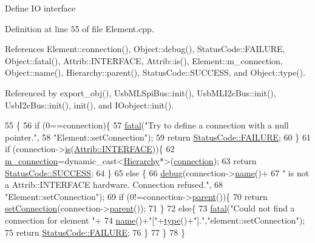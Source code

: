 Define IO interface 

Definition at line 55 of file Element.\+cpp.



References Element\+::connection(), Object\+::debug(), Status\+Code\+::\+F\+A\+I\+L\+U\+RE, Object\+::fatal(), Attrib\+::\+I\+N\+T\+E\+R\+F\+A\+CE, Attrib\+::is(), Element\+::m\+\_\+connection, Object\+::name(), Hierarchy\+::parent(), Status\+Code\+::\+S\+U\+C\+C\+E\+SS, and Object\+::type().



Referenced by export\+\_\+obj(), Usb\+M\+L\+Spi\+Bus\+::init(), Usb\+M\+L\+I2c\+Bus\+::init(), Usb\+I2c\+Bus\+::init(), init(), and I\+Oobject\+::init().


\begin{DoxyCode}
55                                                       \{
56   \textcolor{keywordflow}{if} (0==connection)\{
57     \hyperlink{classObject_aad5a16aac7516ce65bd5ec02ab07fc80}{fatal}(\textcolor{stringliteral}{"Try to define a connection with a null pointer."},
58         \textcolor{stringliteral}{"Element::setConnection"});
59     \textcolor{keywordflow}{return} \hyperlink{classStatusCode_a6f565cbeadc76d14c72f047e5e85eb4ba3da73d4c469762eb9d3c960368252b26}{StatusCode::FAILURE};
60   \}
61   \textcolor{keywordflow}{if} (connection->\hyperlink{classAttrib_a704f26af560909ad22065083bb7d4c34}{is}(\hyperlink{classAttrib_a69e171d7cc6417835a5a306d3c764235aa27c16b480a369ea4d18b07b2516bbc7}{Attrib::INTERFACE}))\{
62     \hyperlink{classElement_abe3de7a5dbbc9a6dd2d7e012e5fdb266}{m\_connection}=\textcolor{keyword}{dynamic\_cast<}\hyperlink{classHierarchy}{Hierarchy}*\textcolor{keyword}{>}(\hyperlink{classElement_af57444353c1ddf9fa0109801e97debf7}{connection});
63     \textcolor{keywordflow}{return} \hyperlink{classStatusCode_a6f565cbeadc76d14c72f047e5e85eb4badd0da38d3ba0d922efd1f4619bc37ad8}{StatusCode::SUCCESS};
64   \}
65   \textcolor{keywordflow}{else} \{
66     \hyperlink{classObject_aac010553f022165573714b7014a15f0d}{debug}(connection->\hyperlink{classObject_a300f4c05dd468c7bb8b3c968868443c1}{name}()+
67         \textcolor{stringliteral}{" is not a Attrib::INTERFACE hardware. Connection refused."},
68         \textcolor{stringliteral}{"Element::setConnection"});
69     \textcolor{keywordflow}{if} (0!=connection->\hyperlink{classHierarchy_a1c7bec8257e717f9c1465e06ebf845fc}{parent}())\{
70       \textcolor{keywordflow}{return} \hyperlink{classElement_ab476b4b1df5954141ceb14f072433b89}{setConnection}(connection->\hyperlink{classHierarchy_a1c7bec8257e717f9c1465e06ebf845fc}{parent}());
71     \}
72     \textcolor{keywordflow}{else}\{
73       \hyperlink{classObject_aad5a16aac7516ce65bd5ec02ab07fc80}{fatal}(\textcolor{stringliteral}{"Could not find a connection for element "}+
74           \hyperlink{classObject_a300f4c05dd468c7bb8b3c968868443c1}{name}()+\textcolor{stringliteral}{"["}+\hyperlink{classObject_a84f99f70f144a83e1582d1d0f84e4e62}{type}()+\textcolor{stringliteral}{"]."},\textcolor{stringliteral}{"element::setConnection"});
75       \textcolor{keywordflow}{return} \hyperlink{classStatusCode_a6f565cbeadc76d14c72f047e5e85eb4ba3da73d4c469762eb9d3c960368252b26}{StatusCode::FAILURE};
76     \}
77   \}
78 \}
\end{DoxyCode}
